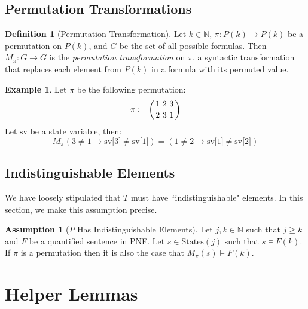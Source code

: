 \documentclass[12pt]{article}
\theoremstyle{definition}
\newtheorem{assumption}{Assumption}
\newtheorem{definition}{Definition}
\newtheorem{example}{Example}
\theoremstyle{remark}
\newcommand{\msp}{\text{ }}
\newcommand{\states}{\text{States}}
\newcommand{\perm}{\genfrac{}{}{0pt}{}}
\begin{document}
\subsection{Permutation Transformations}

\begin{definition}[Permutation Transformation]
  Let $k \in \mathbb{N}$, $\pi : P(k) \to P(k)$ be a permutation on $P(k)$, and $G$ be the set of all possible formulas.  Then $M_\pi : G \to G$ is the \textit{permutation transformation} on $\pi$, a syntactic transformation that replaces each element from $P(k)$ in a formula with its permuted value.
\end{definition}

\begin{example}
  Let $\pi$ be the following permutation:
  $$\pi := \left( \perm{1 \msp 2 \msp 3}{2 \msp 3 \msp 1} \right)$$
  Let $\text{sv}$ be a state variable, then:
  $$M_\pi(3 \neq 1 \rightarrow \text{sv[3]} \neq \text{sv[1]}) = (1 \neq 2 \rightarrow \text{sv[1]} \neq \text{sv[2]})$$
\end{example}

\subsection{Indistinguishable Elements}
We have loosely stipulated that $T$ must have ``indistinguishable" elements.  In this section, we make this assumption precise.

\begin{assumption}[$P$ Has Indistinguishable Elements]
  \label{asmp:indist}
  Let $j,k \in \mathbb{N}$ such that $j \geq k$ and $F$ be a quantified sentence in PNF.  Let $s \in \states(j)$ such that $s \models F(k)$.  If $\pi$ is a permutation then it is also the case that $M_\pi(s) \models F(k)$.
\end{assumption}



\section{Helper Lemmas}
\end{document}
